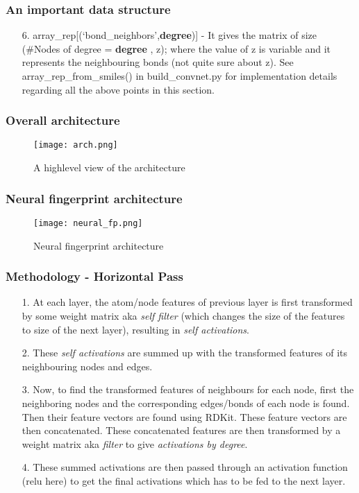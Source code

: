\documentclass{beamer}
\begin{document}
\begin{frame}
\frametitle{An important data structure}

\begin{enumerate}
\item[6.] array\_rep[(`bond\_neighbors',\textbf{degree})] - It gives the matrix of size (\#Nodes of degree = \textbf{degree} , z); where the value of z is variable and it represents the neighbouring bonds (not quite sure about z). See array\_rep\_from\_smiles() in build\_convnet.py for implementation details regarding all the above points in this section. 

\end{enumerate}
	
\end{frame}


\begin{frame}
\frametitle{Overall architecture}
\begin{figure}[]
	\centering
	\caption{A highlevel view of the architecture}
	\label{arch}
	\texttt{[image: arch.png]}
\end{figure}
\end{frame}

\begin{frame}
\frametitle{Neural fingerprint architecture}
\begin{figure}[]
	\centering
	\caption{Neural fingerprint architecture}
	\label{neural_fp}
	\texttt{[image: neural\_fp.png]}
\end{figure}
\end{frame}

\begin{frame}
\frametitle{Methodology - Horizontal Pass}
\begin{enumerate}
 \item[1.] At each layer, the atom/node features of previous layer is first transformed by some weight matrix aka \textit{self filter} (which changes the size of the features to size of the next layer), resulting in \textit{self activations}.
 
 \item[2.] These \textit{self activations} are summed up with the transformed features of its neighbouring nodes and edges.
 
 \item[3.] Now, to find the transformed features of neighbours for each node, first the neighboring nodes and the corresponding edges/bonds of each node is found. Then their feature vectors are found using RDKit. These feature vectors are then concatenated. These concatenated features are then transformed by a weight matrix aka \textit{filter} to give \textit{activations by degree}.
 
 \item[4.] These summed activations are then passed through an activation function (relu here) to get the final activations which has to be fed to the next layer. 
 
 \end{enumerate}
\end{frame}
\end{document}
